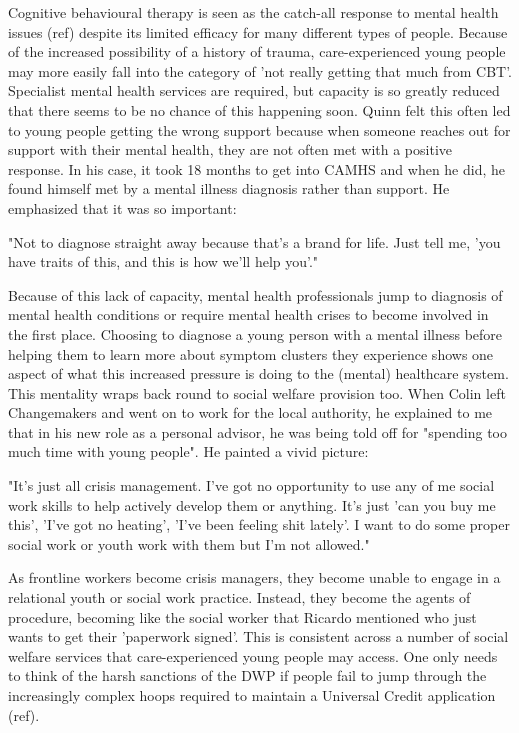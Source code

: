 Cognitive behavioural therapy is seen as the catch-all response to mental health issues (ref) despite its limited efficacy for many different types of people. Because of the increased possibility of a history of trauma, care-experienced young people may more easily fall into the category of 'not really getting that much from CBT'. Specialist mental health services are required, but capacity is so greatly reduced that there seems to be no chance of this happening soon. Quinn felt this often led to young people getting the wrong support because when someone reaches out for support with their mental health, they are not often met with a positive response. In his case, it took 18 months to get into CAMHS and when he did, he found himself met by a mental illness diagnosis rather than support. He emphasized that it was so important:

"Not to diagnose straight away because that's a brand for life. Just tell me, 'you have traits of this, and this is how we'll help you'."

Because of this lack of capacity, mental health professionals jump to diagnosis of mental health conditions or require mental health crises to become involved in the first place. Choosing to diagnose a young person with a mental illness before helping them to learn more about symptom clusters they experience shows one aspect of what this increased pressure is doing to the (mental) healthcare system. This mentality wraps back round to social welfare provision too. When Colin left Changemakers and went on to work for the local authority, he explained to me that in his new role as a personal advisor, he was being told off for "spending too much time with young people". He painted a vivid picture:

"It's just all crisis management. I've got no opportunity to use any of me social work skills to help actively develop them or anything. It's just 'can you buy me this', 'I've got no heating', 'I've been feeling shit lately'. I want to do some proper social work or youth work with them but I'm not allowed."

As frontline workers become crisis managers, they become unable to engage in a relational youth or social work practice. Instead, they become the agents of procedure, becoming like the social worker that Ricardo mentioned who just wants to get their 'paperwork signed'. This is consistent across a number of social welfare services that care-experienced young people may access. One only needs to think of the harsh sanctions of the DWP if people fail to jump through the increasingly complex hoops required to maintain a Universal Credit application (ref).

